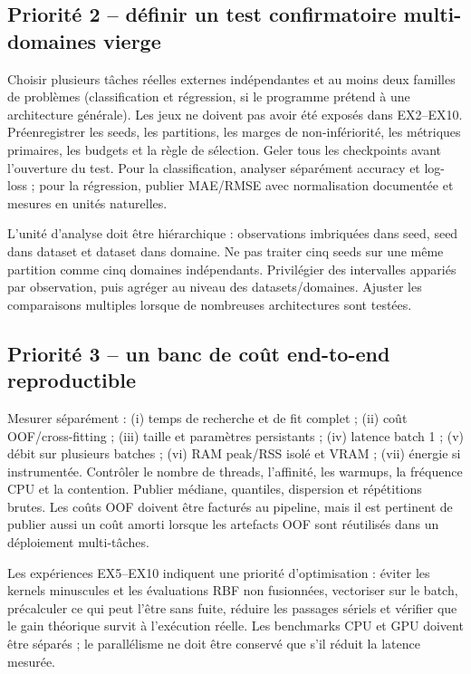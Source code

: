 \documentclass[11pt,a4paper]{article}
\begin{document}
\subsection{Priorité 2 -- définir un test confirmatoire multi-domaines vierge}

Choisir plusieurs tâches réelles externes indépendantes et au moins deux familles de problèmes (classification et régression, si le programme prétend à une architecture générale). Les jeux ne doivent pas avoir été exposés dans EX2--EX10. Préenregistrer les seeds, les partitions, les marges de non-infériorité, les métriques primaires, les budgets et la règle de sélection. Geler tous les checkpoints avant l'ouverture du test. Pour la classification, analyser séparément accuracy et log-loss ; pour la régression, publier MAE/RMSE avec normalisation documentée et mesures en unités naturelles.

L'unité d'analyse doit être hiérarchique : observations imbriquées dans seed, seed dans dataset et dataset dans domaine. Ne pas traiter cinq seeds sur une même partition comme cinq domaines indépendants. Privilégier des intervalles appariés par observation, puis agréger au niveau des datasets/domaines. Ajuster les comparaisons multiples lorsque de nombreuses architectures sont testées.

\subsection{Priorité 3 -- un banc de coût end-to-end reproductible}

Mesurer séparément : (i) temps de recherche et de fit complet ; (ii) coût OOF/cross-fitting ; (iii) taille et paramètres persistants ; (iv) latence batch 1 ; (v) débit sur plusieurs batches ; (vi) RAM peak/RSS isolé et VRAM ; (vii) énergie si instrumentée. Contrôler le nombre de threads, l'affinité, les warmups, la fréquence CPU et la contention. Publier médiane, quantiles, dispersion et répétitions brutes. Les coûts OOF doivent être facturés au pipeline, mais il est pertinent de publier aussi un coût amorti lorsque les artefacts OOF sont réutilisés dans un déploiement multi-tâches.

Les expériences EX5--EX10 indiquent une priorité d'optimisation : éviter les kernels minuscules et les évaluations RBF non fusionnées, vectoriser sur le batch, précalculer ce qui peut l'être sans fuite, réduire les passages sériels et vérifier que le gain théorique survit à l'exécution réelle. Les benchmarks CPU et GPU doivent être séparés ; le parallélisme ne doit être conservé que s'il réduit la latence mesurée.
\end{document}
